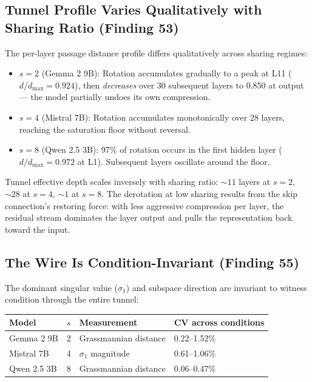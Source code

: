 \documentclass[12pt]{article}
\begin{document}
\subsection{Tunnel Profile Varies Qualitatively with Sharing Ratio (Finding 53)}

The per-layer passage distance profile differs qualitatively across sharing regimes:

\begin{itemize}
\item \textbf{$s = 2$} (Gemma 2 9B): Rotation accumulates gradually to a peak at L11 ($d/d_{\max} = 0.924$), then \textit{decreases} over 30 subsequent layers to 0.850 at output --- the model partially undoes its own compression.
\item \textbf{$s = 4$} (Mistral 7B): Rotation accumulates monotonically over 28 layers, reaching the saturation floor without reversal.
\item \textbf{$s = 8$} (Qwen 2.5 3B): 97\% of rotation occurs in the first hidden layer ($d/d_{\max} = 0.972$ at L1). Subsequent layers oscillate around the floor.
\end{itemize}

Tunnel effective depth scales inversely with sharing ratio: ${\sim}11$ layers at $s = 2$, ${\sim}28$ at $s = 4$, ${\sim}1$ at $s = 8$. The derotation at low sharing results from the skip connection's restoring force: with less aggressive compression per layer, the residual stream dominates the layer output and pulls the representation back toward the input.

\subsection{The Wire Is Condition-Invariant (Finding 55)}

The dominant singular value ($\sigma_1$) and subspace direction are invariant to witness condition through the entire tunnel:

\begin{table}[h]
\centering
\begin{tabular}{llll}
\toprule
\textbf{Model} & \textbf{$s$} & \textbf{Measurement} & \textbf{CV across conditions} \\
\midrule
Gemma 2 9B & 2 & Grassmannian distance & 0.22--1.52\% \\
Mistral 7B & 4 & $\sigma_1$ magnitude & 0.61--1.06\% \\
Qwen 2.5 3B & 8 & Grassmannian distance & 0.06--0.47\% \\
\bottomrule
\end{tabular}
\end{table}
\end{document}
